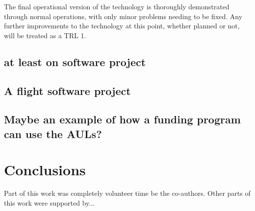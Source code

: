 \documentclass[referee,a4paper,12pt,traditabstract]{swsc}
\begin{document}
\begin{linenumbers}
The final operational version of the technology is thoroughly demonstrated through normal operations, with only minor problems needing to be fixed. Any further improvements to the technology at this point, whether planned or not, will be treated as a TRL 1.

\subsection{at least on software project}
\subsection{A flight software project}

\subsection{Maybe an example of how a funding program can use the AULs? }


\section{Conclusions}


\begin{acknowledgements}
      Part of this work was completely volunteer time be the co-authors. Other parts of this work were supported by...
\end{acknowledgements}



   
\end{linenumbers}
\end{document}
